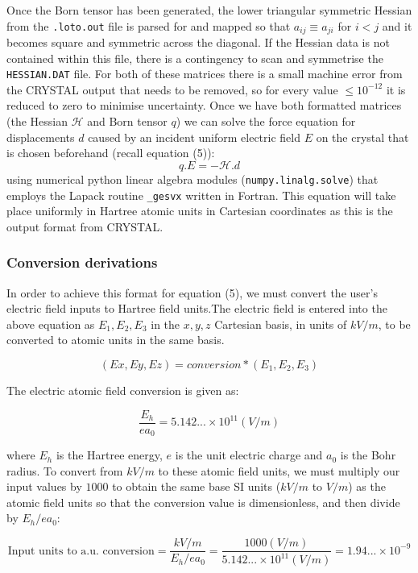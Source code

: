 \documentclass[10pt]{article}
\begin{document}
Once the Born tensor has been generated, the lower triangular symmetric Hessian from the \texttt{.loto.out} file is parsed for and mapped so that $a_{ij} \equiv a_{ji}$ for $i < j$ and it becomes square and symmetric across the diagonal. If the Hessian data is not contained within this file, there is a contingency to scan and symmetrise the \texttt{HESSIAN.DAT} file. For both of these matrices there is a small machine error from the CRYSTAL output that needs to be removed, so for every value $\leq 10^{-12}$ it is reduced to zero to minimise uncertainty. Once we have both formatted matrices (the Hessian $\mathcal{H}$ and Born tensor $q$) we can solve the force equation for displacements $d$ caused by an incident uniform electric field $E$ on the crystal that is chosen beforehand (recall equation (5)):
\begin{equation*}
q.E = -\mathcal{H}.d
\end{equation*}
using numerical python linear algebra modules (\texttt{numpy.linalg.solve}) that employs the Lapack routine \texttt{\_gesvx} written in Fortran. This equation will take place uniformly in Hartree atomic units in Cartesian coordinates as this is the output format from CRYSTAL.

\subsubsection{Conversion derivations}
In order to achieve this format for equation (5), we must convert the user's electric field inputs to Hartree field units.The electric field is entered into the above equation as $E_1, E_2, E_3$ in the $x, y, z$ Cartesian basis, in units of $kV/m$, to be converted to atomic units in the same basis. 

\begin{equation}
	(Ex, Ey, Ez) = conversion*(E_1, E_2, E_3)
\end{equation}

The electric atomic field conversion is given as:

$$\frac{E_h}{ea_0} = 5.142...\times 10^{11} (V/m)$$

where $E_h$ is the Hartree energy, $e$ is the unit electric charge and $a_0$ is the Bohr radius. To convert from $kV/m$ to these atomic field units, we must multiply our input values by $1000$ to obtain the same base SI units ($kV/m$ to $V/m$) as the atomic field units so that the conversion value is dimensionless, and then divide by $E_h/ea_0$:

$$\text{Input units to a.u. conversion} = \frac{kV/m}{E_h/ea_0} = \frac{1000(V/m)}{5.142...\times 10^{11} (V/m)} = 1.94...\times10^{-9}$$
\end{document}
